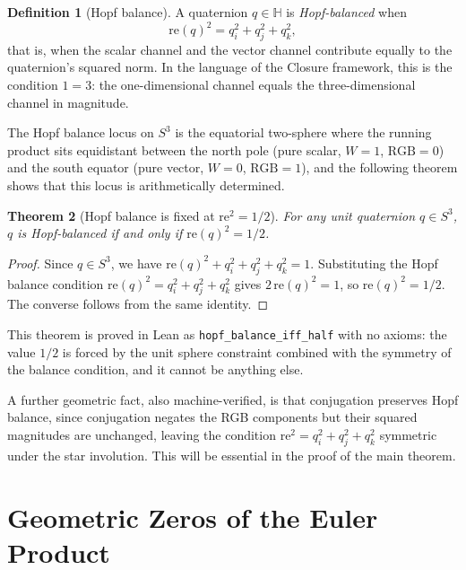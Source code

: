 \documentclass[12pt,a4paper]{article}
\newtheorem{theorem}{Theorem}[section]
\theoremstyle{definition}
\newtheorem{definition}[theorem]{Definition}
\theoremstyle{remark}
\begin{document}
\begin{definition}[Hopf balance]\label{def:hopf}
A quaternion $q \in \mathbb{H}$ is \emph{Hopf-balanced} when
\[
  \mathrm{re}(q)^2 = q_i^2 + q_j^2 + q_k^2,
\]
that is, when the scalar channel and the vector channel contribute equally
to the quaternion's squared norm. In the language of the Closure framework,
this is the condition $1 = 3$: the one-dimensional channel equals the
three-dimensional channel in magnitude.
\end{definition}

The Hopf balance locus on $S^3$ is the equatorial two-sphere where the running
product sits equidistant between the north pole (pure scalar, $W = 1$,
$\mathrm{RGB} = 0$) and the south equator (pure vector, $W = 0$,
$\mathrm{RGB} = 1$), and the following theorem shows that this locus is
arithmetically determined.

\begin{theorem}[Hopf balance is fixed at $\mathrm{re}^2 = 1/2$]\label{thm:hopf_half}
For any unit quaternion $q \in S^3$, $q$ is Hopf-balanced if and only if
$\mathrm{re}(q)^2 = 1/2$.
\end{theorem}

\begin{proof}
Since $q \in S^3$, we have $\mathrm{re}(q)^2 + q_i^2 + q_j^2 + q_k^2 = 1$.
Substituting the Hopf balance condition
$\mathrm{re}(q)^2 = q_i^2 + q_j^2 + q_k^2$ gives $2\,\mathrm{re}(q)^2 = 1$,
so $\mathrm{re}(q)^2 = 1/2$. The converse follows from the same identity.
\end{proof}

This theorem is proved in Lean as \texttt{hopf\_balance\_iff\_half} with no
axioms: the value $1/2$ is forced by the unit sphere constraint combined with
the symmetry of the balance condition, and it cannot be anything else.

A further geometric fact, also machine-verified, is that conjugation preserves
Hopf balance, since conjugation negates the RGB components but their squared
magnitudes are unchanged, leaving the condition
$\mathrm{re}^2 = q_i^2+q_j^2+q_k^2$ symmetric under the star involution.
This will be essential in the proof of the main theorem.

\section{Geometric Zeros of the Euler Product}
\end{document}

